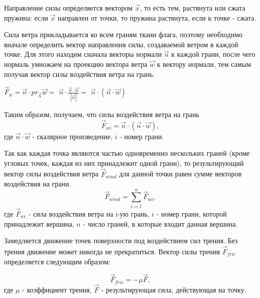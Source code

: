\vspace{0.3cm}Направление силы определяется вектором $\vec{x}$, то есть тем, растянута или сжата пружина: если $\vec{x}$ направлен от точки, то пружина растянута, если к точке - сжата.

\vspace{0.3cm}Сила ветра прикладывается ко всем граням ткани флага, поэтому необходимо вначале определить вектор направления силы, создаваемой ветром в каждой точке. Для этого находим сначала векторы нормали $\vec{n}$ к каждой грани, после чего нормаль умножаем на проекцию вектора ветра $\vec{w}$ к вектору нормали, тем самым получая вектор силы воздействия ветра на грань.

\begin{center}
	$\vec{F}_{w} = \vec{n} \cdot pr_{\vec{n}}\vec{w} =$
	$\vec{n} \cdot \displaystyle \frac{\vec{n} \cdot \vec{w}}{|\vec{n}|} =$
	$\vec{n} \cdot (\vec{n} \cdot \vec{w})$\\
\end{center}

Таким образом, получаем, что силы воздействия ветра на грань
\begin{equation}
\displaystyle \vec{F}_{wi} = \vec{n} \cdot (\vec{n} \cdot \vec{w}),
\end{equation}
где $\vec{n} \cdot \vec{w}$ - скалярное произведение, $i$ - номер грани.

\vspace{0.3cm}Так как каждая точка являются частью одновременно нескольких граней (кроме угловых точек, каждая из них принадлежит одной грани), то результирующий вектор силы воздействия ветра $\vec{F}_{wind}$ для данной точки равен сумме векторов воздействия на грани.
\begin{equation}
\displaystyle \vec{F}_{wind} = \sum_{i=1}^n \vec{F}_{wi},
\end{equation}
где $\vec{F}_{wi}$ - сила воздействия ветра на i-ую грань, $i$ - номер грани, которой принадлежит вершина, $n$ - число граней, в которые входит данная вершина.

\vspace{0.3cm}Замедляется движение точек поверхности под воздействием сил трения. Без трения движение может никогда не прекратиться. Вектор силы трения $\vec{F}_{fric}$ определяется следующим образом:

\begin{equation}
\vec{F}_{fric} = -\mu\vec{F},
\label{eq:fric}
\end{equation}
где $\mu$ - коэффициент трения, $\vec{F}$ - результирующая сила, действующая на точку.

